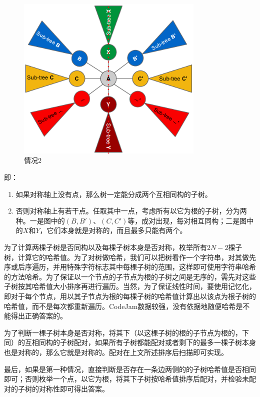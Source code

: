 \documentclass[UTF8]{ctexart}
\theoremstyle{nonumberplain}
\begin{document}
			\begin{figure}[ht]
				\centering
				\includegraphics[width=0.8\textwidth]{figgcj2014c_2.png}
				\caption{情况2}
			\end{figure}
		
			即：
		
			\begin{enumerate}
				\item 如果对称轴上没有点，那么树一定能分成两个互相同构的子树。
				\item 否则对称轴上有若干点。任取其中一点，考虑所有以它为根的子树，分为两种。一是图中的$(B,B')$、$(C,C')$等，成对出现，每对相互同构；二是图中的$X$和$Y$，它们本身就是对称的，而且最多只能有两个。
			\end{enumerate}
			
			为了计算两棵子树是否同构以及每棵子树本身是否对称，枚举所有$2N-2$棵子树，计算它的哈希值。为了对树做哈希，我们可以把树看作一个字符串，对其做先序或后序遍历，并用特殊字符标志其中每棵子树的范围，这样即可使用字符串哈希的方法哈希。为了保证以一个节点的子节点为根的子树之间是无序的，需先对这些子树按其哈希值大小排序再进行遍历。当然，为了保证线性时间，要使用记忆化，即对于每个节点，用以其子节点为根的每棵子树的哈希值计算出以该点为根子树的哈希值，而不是每次都重新遍历。CodeJam数据较强，没有依据地随便哈希是不能得出正确答案的。
			
			为了判断一棵子树本身是否对称，将其下（以这棵子树的根的子节点为根的，下同）的互相同构的子树配对，如果所有子树都能配对或者剩下的最多一棵子树本身也是对称的，那么它就是对称的。配对在上文所述排序后扫描即可实现。
			
			最后，如果是第一种情况，直接判断是否存在一条边两侧的的子树哈希值是否相同即可；否则枚举一个点，以它为根，将其下子树按哈希值排序后配对，并检验未配对的子树的对称性即可得出答案。
		
\end{document}
